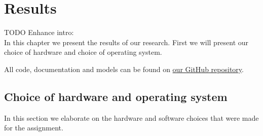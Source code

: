 \documentclass[12pt]{scrreprt}
\begin{document}
\chapter{Results}
\label{Results}
TODO Enhance intro:\\
In this chapter we present the results of our research. First we will present our choice of hardware and choice of operating system.
\par
All code, documentation and models can be found on \href{https://github.com/Yousousen/safety-module-for-care-robot-rose.git}{our GitHub repository}.

\section{Choice of hardware and operating system}
\label{Choice of hardware and software}
In this section we elaborate on the hardware and software choices that were made for the assignment.
\end{document}
